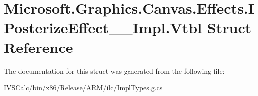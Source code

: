\hypertarget{struct_microsoft_1_1_graphics_1_1_canvas_1_1_effects_1_1_i_posterize_effect_____impl_1_1_vtbl}{}\section{Microsoft.\+Graphics.\+Canvas.\+Effects.\+I\+Posterize\+Effect\+\_\+\+\_\+\+Impl.\+Vtbl Struct Reference}
\label{struct_microsoft_1_1_graphics_1_1_canvas_1_1_effects_1_1_i_posterize_effect_____impl_1_1_vtbl}


The documentation for this struct was generated from the following file\+:\begin{DoxyCompactItemize}
\item 
I\+V\+S\+Calc/bin/x86/\+Release/\+A\+R\+M/ilc/Impl\+Types.\+g.\+cs\end{DoxyCompactItemize}
